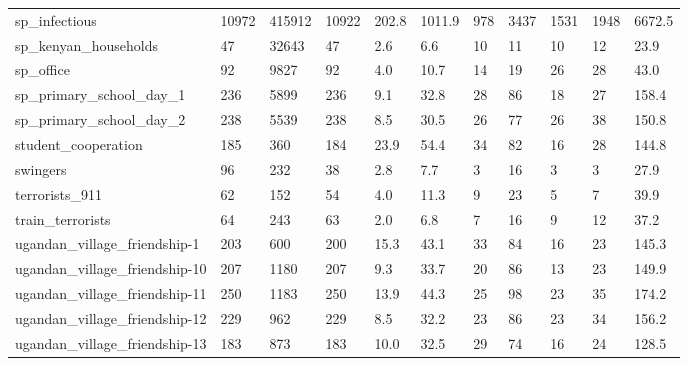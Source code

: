 \begin{longtable}{lllllllllll}
 sp\_infectious                                      & 10972      & 415912    & 10922 & 202.8  & 1011.9 & 978   & 3437   & 1531   & 1948   & 6672.5  \\
 sp\_kenyan\_households                               & 47         & 32643     & 47    & 2.6    & 6.6    & 10    & 11     & 10     & 12     & 23.9    \\
 sp\_office                                          & 92         & 9827      & 92    & 4.0    & 10.7   & 14    & 19     & 26     & 28     & 43.0    \\
 sp\_primary\_school\_day\_1                            & 236        & 5899      & 236   & 9.1    & 32.8   & 28    & 86     & 18     & 27     & 158.4   \\
 sp\_primary\_school\_day\_2                            & 238        & 5539      & 238   & 8.5    & 30.5   & 26    & 77     & 26     & 38     & 150.8   \\
 student\_cooperation                                & 185        & 360       & 184   & 23.9   & 54.4   & 34    & 82     & 16     & 28     & 144.8   \\
 swingers                                           & 96         & 232       & 38    & 2.8    & 7.7    & 3     & 16     & 3      & 3      & 27.9    \\
 terrorists\_911                                     & 62         & 152       & 54    & 4.0    & 11.3   & 9     & 23     & 5      & 7      & 39.9    \\
 train\_terrorists                                   & 64         & 243       & 63    & 2.0    & 6.8    & 7     & 16     & 9      & 12     & 37.2    \\
 ugandan\_village\_friendship-1                       & 203        & 600       & 200   & 15.3   & 43.1   & 33    & 84     & 16     & 23     & 145.3   \\
 ugandan\_village\_friendship-10                      & 207        & 1180      & 207   & 9.3    & 33.7   & 20    & 86     & 13     & 23     & 149.9   \\
 ugandan\_village\_friendship-11                      & 250        & 1183      & 250   & 13.9   & 44.3   & 25    & 98     & 23     & 35     & 174.2   \\
 ugandan\_village\_friendship-12                      & 229        & 962       & 229   & 8.5    & 32.2   & 23    & 86     & 23     & 34     & 156.2   \\
 ugandan\_village\_friendship-13                      & 183        & 873       & 183   & 10.0   & 32.5   & 29    & 74     & 16     & 24     & 128.5   \\

\end{longtable}
